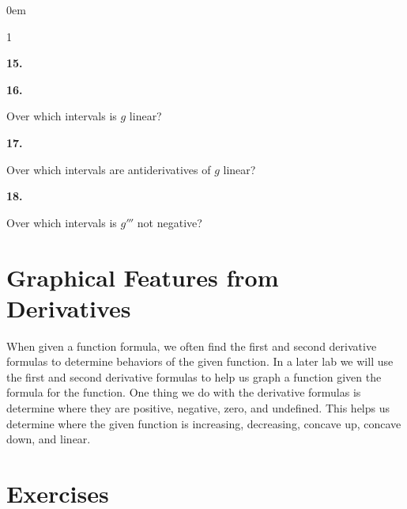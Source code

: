 \documentclass[12pt,]{book}
\theoremstyle{plain}
\theoremstyle{definition}
\numberwithin{equation}{section}
\newenvironment{exercisegroup}%
{\medskip\noindent}%
{\par\bigskip}%
\newlength{\exercisegroupindent}%
\newlength{\exercisegroupitemwidth}%
\newenvironment{exercisegrouplist}%
{\vspace{-\partopsep}%
\begin{adjustwidth}{\exercisegroupindent}{0em}}%
{\end{adjustwidth}%
\vspace{-\partopsep}%
\vspace{\baselineskip}}%
\newenvironment{exercisegroupbycol}[1]%
{\begin{exercisegrouplist}%
\vspace{-\multicolsep}%
\begin{multicols}{#1}%
\setlength{\parindent}{0em}%
\setlength{\exercisegroupitemwidth}{\linewidth}}%
{\end{multicols}%
\vspace{-\multicolsep}%
\end{exercisegrouplist}}%
\newenvironment{exercisegroupitem}[1]%
{\begin{minipage}[t]{\exercisegroupitemwidth}
\vspace{0pt}%
{\bfseries#1}%
\rule{0pt}{\baselineskip}}{\strut%
\end{minipage}%
\hspace{\columnsep}}%
\providecommand\phantomsection{}
\newcommand{\td}[1]{#1'''}
\begin{document}
\begin{exercisegroup}
\begin{exercisegroupbycol}{1}
\begin{exercisegroupitem}{15. }
\end{exercisegroupitem}%
\par%
\begin{exercisegroupitem}{16. }\phantomsection\hypertarget{exercise-199}{\null}
Over which intervals is \(g\) linear?%
\end{exercisegroupitem}%
\par%
\begin{exercisegroupitem}{17. }\phantomsection\hypertarget{exercise-200}{\null}
Over which intervals are antiderivatives of \(g\) linear?%
\end{exercisegroupitem}%
\par%
\begin{exercisegroupitem}{18. }\phantomsection\hypertarget{exercise-201}{\null}
Over which intervals is \(\td{g}\) not negative?%
\end{exercisegroupitem}%
\par%
\end{exercisegroupbycol}%
\end{exercisegroup}%
\typeout{************************************************}
\typeout{************************************************}
\section[Graphical Features from Derivatives]{Graphical Features from Derivatives}\label{section-graphical-features-from-derivatives}
When given a function formula, we  often find the first and second derivative formulas to determine behaviors of the given function.  In a later lab we will use the first and second derivative formulas to help us graph a function given the formula for the function.  One thing we do with the derivative formulas is determine where they are positive, negative, zero, and undefined. This helps us determine where the given function is increasing, decreasing, concave up, concave down, and linear.%
\typeout{************************************************}
\typeout{************************************************}
\section*{Exercises}\label{exercises-26}
\end{document}
